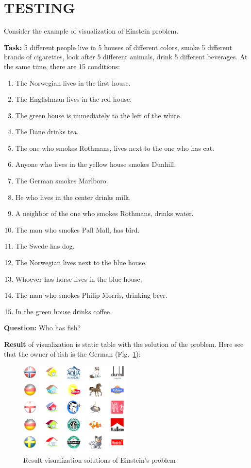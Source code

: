 \documentclass[a4paper, 10pt, conference]{ieeeconf}
\begin{document}
\section{TESTING}
Consider the example of visualization of Einstein problem.

\textbf{Task:}
5 different people live in 5 houses of different colors, smoke 5 different brands of cigarettes, look after 5 different animals, drink 5 different beverages.
At the same time, there are 15 conditions:
\begin{enumerate}
\item The Norwegian lives in the first house.
\item The Englishman lives in the red house.
\item The green house is immediately to the left of the white.
\item The Dane drinks tea.
\item The one who smokes Rothmans, lives next to the one who has cat.
\item Anyone who lives in the yellow house smokes Dunhill.
\item The German smokes Marlboro.
\item He who lives in the center drinks milk.
\item A neighbor of the one who smokes Rothmans, drinks water.
\item The man who smokes Pall Mall, has bird.
\item The Swede has dog.
\item The Norwegian lives next to the blue house.
\item Whoever has horse lives in the blue house.
\item The man who smokes Philip Morris, drinking beer.
\item In the green house drinks coffee.
\end{enumerate}

\textbf{Question:} Who has fish?

\textbf{Result} of visualization is static  table with the solution of the problem. Here see that the owner of fish is the German (Fig.~\ref{fig:test}):

\begin{figure}[H]
    \centering
    \includegraphics[width=0.5\textwidth]{test.png}
    \caption{Result visualization solutions of Einstein's problem}
    \label{fig:test}
\end{figure}
\end{document}
